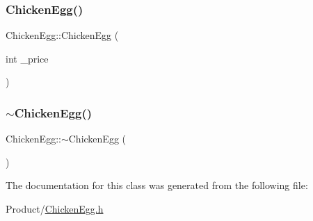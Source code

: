 \mbox{\label{classChickenEgg_a60870874efefdf7d6d4604ccbe6a1885}} 
\subsubsection{\texorpdfstring{ChickenEgg()}{ChickenEgg()}\hspace{0.1cm}{\footnotesize\ttfamily [2/2]}}
{\footnotesize\ttfamily Chicken\+Egg\+::\+Chicken\+Egg (\begin{DoxyParamCaption}\item[{int}]{\+\_\+price }\end{DoxyParamCaption})}

\mbox{\label{classChickenEgg_aa71db8cfe4808e5dbf84643cfe0d4778}} 
\subsubsection{\texorpdfstring{$\sim$ChickenEgg()}{~ChickenEgg()}}
{\footnotesize\ttfamily Chicken\+Egg\+::$\sim$\+Chicken\+Egg (\begin{DoxyParamCaption}{ }\end{DoxyParamCaption})}



The documentation for this class was generated from the following file\+:\begin{DoxyCompactItemize}
\item 
Product/\mbox{\hyperlink{ChickenEgg_8h}{Chicken\+Egg.\+h}}\end{DoxyCompactItemize}
